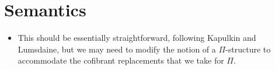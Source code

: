 \documentclass[reqno,10pt,a4paper,oneside,draft]{amsart}
\begin{document}
\newpage

\section{Semantics}


\begin{itemize}
\item This should be essentially straightforward, following Kapulkin and Lumsdaine, but we may need to modify the notion of a $\Pi$-structure to accommodate the cofibrant replacements that we take for $\Pi$.
\end{itemize}

\nocite{*}




\end{document}
